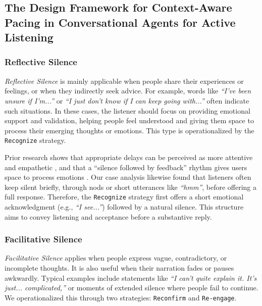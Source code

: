 \subsection{The Design Framework for Context-Aware Pacing in Conversational Agents for Active Listening}

\subsubsection{Reflective Silence}
\emph{Reflective Silence} is mainly applicable when people share their experiences or feelings, or when they indirectly seek advice. For example, words like \textit{``I've been unsure if I'm...''} or \textit{``I just don't know if I can keep going with...''} often indicate such situations. In these cases, the listener should focus on providing emotional support and validation, helping people feel understood and giving them space to process their emerging thoughts or emotions. This type is operationalized by the \texttt{Recognize} strategy.


Prior research shows that appropriate delays can be perceived as more attentive and empathetic \cite{anzabi2023effect}, and that a ``silence followed by feedback'' rhythm gives users space to process emotions \cite{10.1145/3555164}. 
Our case analysis likewise found that listeners often keep silent briefly, through nods or short utterances like \textit{``hmm''}, before offering a full response.
Therefore, the \texttt{Recognize} strategy first offers a short emotional acknowledgment (e.g., \textit{``I see...''}) followed by a natural silence. This structure aims to convey listening and acceptance before a substantive reply.

\subsubsection{Facilitative Silence}

\emph{Facilitative Silence} applies when people express vague, contradictory, or incomplete thoughts. It is also useful when their narration fades or pauses awkwardly. Typical examples include statements like \textit{``I can't quite explain it. It's just... complicated,''} or moments of extended silence where people fail to continue.  
We operationalized this through two strategies: \texttt{Reconfirm} and \texttt{Re-engage}.

